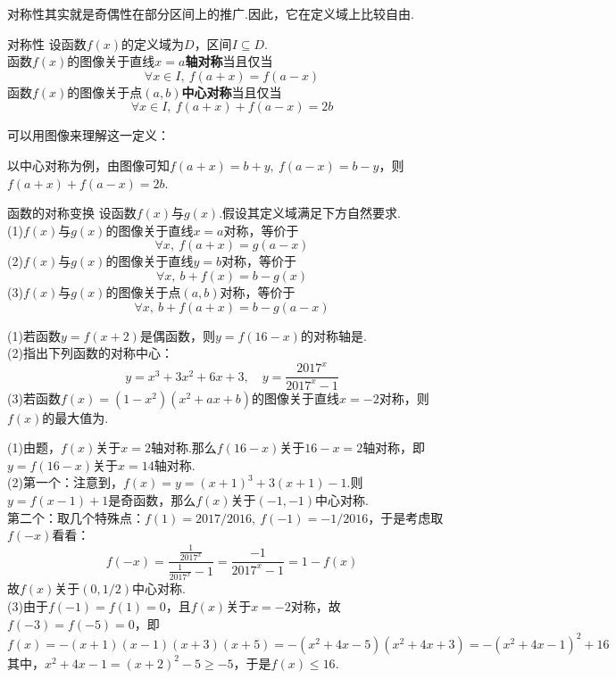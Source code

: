 \documentclass[lang=cn, zihao=5]{elegantbook}
\newcommand{\tk}{\uline{\hspace{4em}}}
\begin{document}
对称性其实就是奇偶性在部分区间上的推广.因此，它在定义域上比较自由.

\begin{definition}{对称性} %
    设函数$f(x)$的定义域为$D$，区间$I \subseteq D$.\\
    函数$f(x)$的图像关于直线$x=a$\textbf{轴对称}当且仅当
    $$ \forall x \in I,~ f(a+x)=f(a-x) $$
    函数$f(x)$的图像关于点$(a,b)$\textbf{中心对称}当且仅当
    $$ \forall x \in I,~ f(a+x)+f(a-x)=2b $$
\end{definition}

可以用图像来理解这一定义：

\begin{figure}[h!]
	\centering
	
\end{figure}

以中心对称为例，由图像可知$f(a+x)=b+y,~f(a-x)=b-y$，则$f(a+x)+f(a-x)=2b$.

\begin{proposition}{函数的对称变换}
    设函数$f(x)$与$g(x)$.假设其定义域满足下方自然要求.\\
    (1)$f(x)$与$g(x)$的图像关于直线$x=a$对称，等价于$$\forall x,~f(a+x)=g(a-x)$$
    (2)$f(x)$与$g(x)$的图像关于直线$y=b$对称，等价于$$\forall x,~b+f(x)=b-g(x)$$
    (3)$f(x)$与$g(x)$的图像关于点$(a,b)$对称，等价于$$\forall x,~b+f(a+x)=b-g(a-x)$$
\end{proposition}

\begin{example}
	(1)若函数$y=f(x+2)$是偶函数，则$y=f(16-x)$的对称轴是\tk . \\
	(2)指出下列函数的对称中心：$$y=x^3+3x^2+6x+3,\quad y=\frac{2017^x}{2017^x-1}$$
	(3)若函数$f(x)=(1-x^2)(x^2+ax+b)$的图像关于直线$x=-2$对称，则$f(x)$的最大值为\tk .
\end{example}
\begin{solution}
	(1)由题，$f(x)$关于$x=2$轴对称.那么$f(16-x)$关于$16-x=2$轴对称，即$y=f(16-x)$关于$x=14$轴对称. \\
	(2)第一个：注意到，$f(x)=y=(x+1)^3+3(x+1)-1$.则$y=f(x-1)+1$是奇函数，那么$f(x)$关于$(-1,-1)$中心对称. \\
	第二个：取几个特殊点：$f(1)=2017/2016,~f(-1)=-1/2016$，于是考虑取$f(-x)$看看：$$f(-x)=\frac{\frac{1}{2017^x}}{\frac{1}{2017^x}-1} = \frac{-1}{2017^x-1} = 1-f(x)$$
	故$f(x)$关于$(0,1/2)$中心对称. \\
	(3)由于$f(-1)=f(1)=0$，且$f(x)$关于$x=-2$对称，故$f(-3)=f(-5)=0$，即$$f(x)=-(x+1)(x-1)(x+3)(x+5) = -(x^2+4x-5)(x^2+4x+3) = -(x^2+4x-1)^2+16$$
	其中，$x^2+4x-1 = (x+2)^2-5 \geq -5$，于是$f(x) \leq 16$.
\end{solution}
\end{document}
